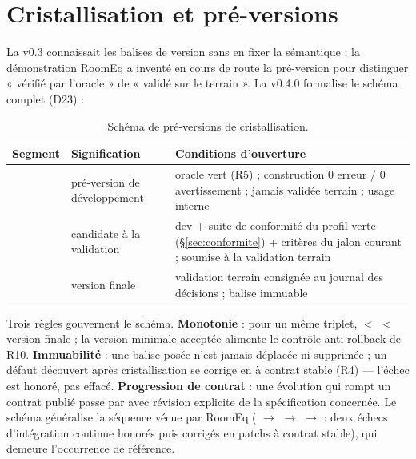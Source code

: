 \section{Cristallisation et pré-versions}\label{sec:preversions}

La v0.3 connaissait les balises de version sans en fixer la sémantique ; la démonstration
RoomEq a inventé en cours de route la pré-version  pour distinguer « vérifié
par l’oracle » de « validé sur le terrain ». La v0.4.0 formalise le schéma complet (D23) :

\begin{table}[htbp]
\centering\small
\caption{Schéma de pré-versions de cristallisation.}
\label{tab:preversions}
\begin{tabularx}{\textwidth}{@{}l l Y@{}}
\toprule
\textbf{Segment} & \textbf{Signification} & \textbf{Conditions d’ouverture} \\
\midrule
{} & pré-version de développement & oracle vert (R5) ; construction
0 erreur / 0 avertissement ; jamais validée terrain ; usage interne \\
 & candidate à la validation & dev + suite de conformité du profil
verte (§\ref{sec:conformite}) + critères du jalon courant ; soumise à la validation
terrain \\
 & version finale & validation terrain consignée au journal des décisions ;
balise immuable \\
\bottomrule
\end{tabularx}
\end{table}

Trois règles gouvernent le schéma. \textbf{Monotonie} : pour un même triplet,
 $<$  $<$ version finale ; la version minimale acceptée alimente
le contrôle anti-rollback de R10. \textbf{Immuabilité} : une balise posée n’est jamais
déplacée ni supprimée ; un défaut découvert après cristallisation se corrige en
 à contrat stable (R4) — l’échec est honoré, pas effacé.
\textbf{Progression de contrat} : une évolution qui rompt un contrat publié passe par
 avec révision explicite de la spécification concernée. Le schéma
généralise la séquence vécue par RoomEq ( $\to$  $\to$
 $\to$  : deux échecs d’intégration continue honorés puis
corrigés en patchs à contrat stable), qui demeure l’occurrence de référence.

